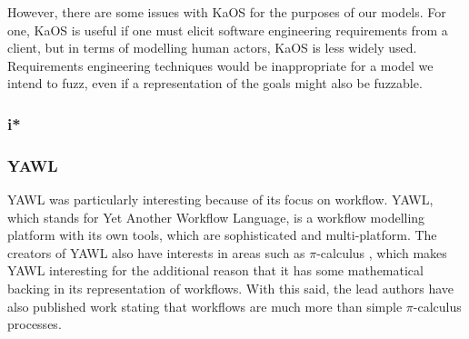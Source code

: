 \documentclass{sig-alternate}
\newcommand{\picalc}{\(\pi\)-calculus }
\begin{document}
However, there are some issues with KaOS for the purposes of our models. For one, KaOS is useful if one must elicit software engineering requirements from a client, but in terms of modelling human actors, KaOS is less widely used. Requirements engineering techniques would be inappropriate for a model we intend to fuzz, even if a representation of the goals might also be fuzzable. \par 

\subsubsection{i*}

\subsubsection{YAWL} %
YAWL was particularly interesting because of its focus on workflow. YAWL, which stands for Yet Another Workflow Language\cite{hofstede2010yawl}, is a workflow modelling platform with its own tools, which are sophisticated and multi-platform. The creators of YAWL also have interests in areas such as \picalc\cite{Aalst2004}, which makes YAWL interesting for the additional reason that it has some mathematical backing in its representation of workflows. With this said, the lead authors have also published work stating that workflows are much more than simple \picalc processes\cite{Aalst2004}. \par
\end{document}

